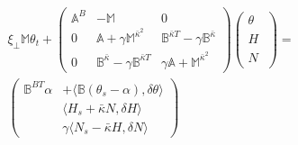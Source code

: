 \begin{multline}
\label{eq:4}
\xi_\perp \mathbb{M} \theta_t + 
\begin{pmatrix}
\mathbb{A}^B &  - \mathbb{M} & 0 \\
0 & 
  \mathbb{A}
+ \gamma  \mathbb{M}^{\bar \kappa^2} &
  \mathbb{B}^{\bar\kappa T}
- \gamma \mathbb{B}^{\bar\kappa} \\
0 & 
  \mathbb{B}^{\bar\kappa}
- \gamma \mathbb{B}^{\bar\kappa T} 
&
%
%
\gamma  \mathbb{A}
+  \mathbb{M}^{\bar \kappa^2}
\end{pmatrix}
%
\begin{pmatrix}
\theta\phantom{\big|\!\!}\\
H\phantom{\big|\!\!} \\
N\phantom{\big|\!\!}
\end{pmatrix}
=\\
\begin{pmatrix}
 \mathbb{B}^{BT}\alpha & +\langle \mathbb{B}(\theta_s-\alpha), \delta \theta\rangle\\
& \langle H_s+\bar\kappa N,\delta H \rangle
\\
&\gamma\langle N_{s}-\bar \kappa H, \delta N \rangle 
\end{pmatrix}
\end{multline}

